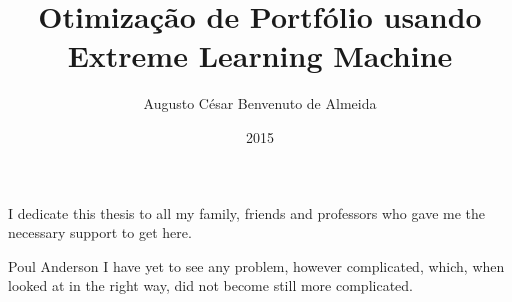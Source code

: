 \documentclass[pt,twoside,onehalfspacing,msc]{risethesis}
\title{Otimização de Portfólio usando Extreme Learning Machine}
\date{2015}
\author{Augusto César Benvenuto de Almeida}
\begin{document}
\frontmatter

\frontpage

\presentationpage

\begin{fichacatalografica}
	\FakeFichaCatalografica %
\end{fichacatalografica}

\banca

\begin{dedicatory}
I dedicate this thesis to all my family, friends and professors who gave me the
necessary support to get here.
\end{dedicatory}

\acknowledgements


\begin{epigraph}[]{Poul Anderson}
I have yet to see any problem, however complicated, which, when looked at in the
right way, did not become still more complicated.
\end{epigraph}

\resumo


\abstract


\listoffigures

\listoftables

\listofacronyms


\tableofcontents

\mainmatter








\begin{references}
  
\end{references}


\theappendix

\end{document}
